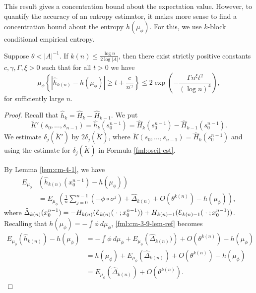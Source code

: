 This result gives a concentration bound about the expectation value. However, to quantify the accuracy of an entropy estimator, it makes more sense to find a concentration bound about the entropy $h(\mu_\phi)$. For this, we use $k$-block conditional empirical entropy.

\begin{theorem}\label{thm:cm-4-2}
	Suppose $\theta < |A|^{-1}$. If $k(n) \leq \frac{\log{n}}{2\log{|A|}}$, then there exist strictly positive constants $c, \gamma, \Gamma, \xi > 0$ such that for all $t > 0$ we have
	\begin{equation}
		\mu_\phi\left\{\left|\hat{h}_{k(n)} - h(\mu_\phi)\right| \geq t + \frac{c}{n^\gamma}\right\} \leq 2\exp\left(-\frac{\Gamma n^\xi t^2}{(\log{n})^4}\right),
	\end{equation}
	for sufficiently large $n$.
	\begin{proof}
		Recall that $\hat{h}_k = \hat{H}_k - \hat{H}_{k - 1}$. We put
		\[
			\tilde{K}'(s_0, \dots, s_{n - 1}) = \hat{h}_k(s_0^{n - 1}) = \hat{H}_k(s_0^{n - 1}) - \hat{H}_{k - 1}(s_0^{n - 1}).
		\]
		We estimate $\delta_j(\tilde{K}')$ by $2\delta_j(\tilde{K})$, where $\tilde{K}(s_0, \dots, s_{n - 1}) = \hat{H}_k(s_0^{n - 1})$ and using the estimate for $\delta_j(\tilde{K})$ in Formula \eqref{fml:oscil-est}.
		
		By Lemma \ref{lem:cm-4-1}, we have
		\begin{align}
			E_{\mu_\phi}&\left(\hat{h}_{k(n)}(x_0^{n - 1}) - h(\mu_\phi)\right) \nonumber \\
				&= E_{\mu_\phi}\left(\frac{1}{n}\sum_{j = 0}^{n - 1}(-\phi \circ \sigma^j) + \hat{\Delta}_{k(n)} + O(\theta^{k(n)}) - h(\mu_\phi)\right), \label{fml:cm-3-9-lem-ref}
		\end{align}
		where $\hat{\Delta}_{k(n)}(x_0^{n - 1}) = -H_{k(n)}(\mathcal{E}_{k(n)}(\mathrel{}\cdot\mathrel{}; x_0^{n - 1})) + H_{k(n) - 1}(\mathcal{E}_{k(n) - 1}(\mathrel{}\cdot\mathrel{}; x_0^{n - 1}))$. 
		Recalling that $h(\mu_\phi) = -\int{\phi\ d\mu_\phi}$, \eqref{fml:cm-3-9-lem-ref} becomes
		\begin{align*}
			E_{\mu_\phi}\left(\hat{h}_{k(n)}\right) - h(\mu_\phi) &= -\int{\phi\ d\mu_\phi} + E_{\mu_\phi}\left(\hat{\Delta}_{k(n)})\right) + O(\theta^{k(n)}) - h(\mu_\phi) \\
				&= h(\mu_\phi) + E_{\mu_\phi}\left(\hat{\Delta}_{k(n)}\right) + O(\theta^{k(n)}) - h(\mu_\phi) \\
				&= E_{\mu_\phi}\left(\hat{\Delta}_{k(n)}\right) + O(\theta^{k(n)}).
		\end{align*}
		

\end{proof}
\end{theorem}
